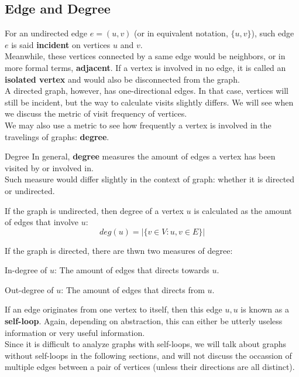 \subsection{Edge and Degree}
For an undirected edge $e = (u, v)$ (or in equivalent notation, $\{u, v\}$), such edge $e$ is said \textbf{incident} on vertices $u$ and $v$. \\
Meanwhile, these vertices connected by a same edge would be neighbors, or in more formal terms, \textbf{adjacent}. If a vertex is involved in no edge, it is called an \textbf{isolated vertex} and would also be disconnected from the graph.\\
A directed graph, however, has one-directional edges. In that case, vertices will still be incident, but the way to calculate visits slightly differs. We will see when we discuss the metric of visit frequency of vertices. \\
We may also use a metric to see how frequently a vertex is involved in the travelings of graphs: \textbf{degree}.
\begin{ln-define}{Degree}{}
    In general, \textbf{degree} measures the amount of edges a vertex has been visited by or involved in. \\
    Such measure would differ slightly in the context of graph: whether it is directed or undirected.

    If the graph is undirected, then degree of a vertex $u$ is calculated as the amount of edges that involve $u$:
    \[deg(u) = |\{v \in V: {u, v} \in E\}|\]

    If the graph is directed, there are thwn two measures of degree:
    \begin{bindenum}
        \item In-degree of $u$: The amount of edges that directs towards $u$.
        \item Out-degree of $u$: The amount of edges that directs from $u$.
    \end{bindenum}
\end{ln-define}
If an edge originates from one vertex to itself, then this edge ${u, u}$ is known as a \textbf{self-loop}. Again, depending on abstraction, this can either be utterly useless information or very useful information. \\
Since it is difficult to analyze graphs with self-loops, we will talk about graphs without self-loops in the following sections, and will not discuss the occassion of multiple edges between a pair of vertices (unless their directions are all distinct).

